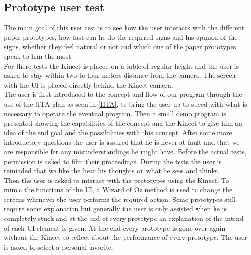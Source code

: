 \subsection{Prototype user test}

The main goal of this user test is to see how the user interacts with the different paper prototypes, how fast can he do the required signs and his opinion of the signs, whether they feel natural or not and which one of the paper prototypes speak to him the most. \\

For there tests the Kinect is placed on a table of regular height and the user is asked to stay within two to four meters distance from the camera. The screen with the UI is placed directly behind the Kinect camera.\\

The user is first introduced to the concept and flow of our program through the use of the HTA plan as seen in \ref{HTA}, to bring the user up to speed with what is necessary to operate the eventual program. Then a small demo program is presented showing the capabilities of the concept and the Kinect to give him an idea of the end goal and the possibilities with this concept. After some more introductory questions the user is assured that he is never at fault and that we are responsible for any misunderstandings he might have. Before the actual tests, permission is asked to film their proceedings. During the tests the user is reminded that we like the hear his thoughts on what he sees and thinks.\\

Then the user is asked to interact with the prototypes using the Kinect. To mimic the functions of the UI, a Wizard of Oz method is used to change the screens whenever the user performs the required action. Some prototypes still require some explanation but generally the user is only assisted when he is completely stuck and at the end of every prototype an explanation of the intend of each UI element is given. At the end every prototype is gone over again without the Kinect to reflect about the performance of every prototype. The user is asked to select a personal favorite.\\

